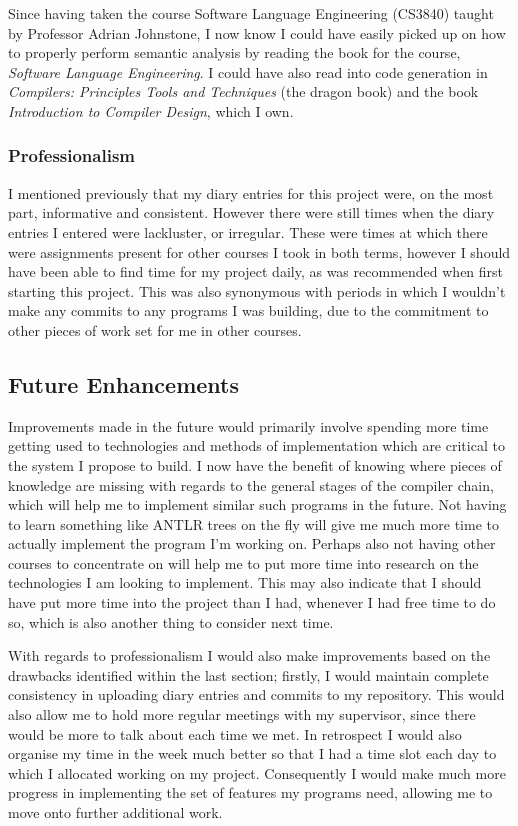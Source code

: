 \documentclass[a4paper, 11pt]{article}
\begin{document}
Since having taken the course Software Language Engineering (CS3840) taught by Professor Adrian Johnstone, I now know I could have easily picked up on how to properly perform semantic analysis by reading the book for the course, \textit{Software Language Engineering}\cite{SLEBook}. I could have also read into code generation in \textit{Compilers: Principles Tools and Techniques}\cite{Dragon} (the dragon book) and the book \textit{Introduction to Compiler Design}\cite{ItCD}, which I own.

\subsubsection{Professionalism}
I mentioned previously that my diary entries for this project were, on the most part, informative and consistent. However there were still times when the diary entries I entered were lackluster, or irregular. These were times at which there were assignments present for other courses I took in both terms, however I should have been able to find time for my project daily, as was recommended when first starting this project. This was also synonymous with periods in which I wouldn't make any commits to any programs I was building, due to the commitment to other pieces of work set for me in other courses.

\subsection{Future Enhancements}
Improvements made in the future would primarily involve spending more time getting used to technologies and methods of implementation which are critical to the system I propose to build. I now have the benefit of knowing where pieces of knowledge are missing with regards to the general stages of the compiler chain, which will help me to implement similar such programs in the future. Not having to learn something like ANTLR trees on the fly will give me much more time to actually implement the program I'm working on. Perhaps also not having other courses to concentrate on will help me to put more time into research on the technologies I am looking to implement. This may also indicate that I should have put more time into the project than I had, whenever I had free time to do so, which is also another thing to consider next time.

With regards to professionalism I would also make improvements based on the drawbacks identified within the last section; firstly, I would maintain complete consistency in uploading diary entries and commits to my repository. This would also allow me to hold more regular meetings with my supervisor, since there would be more to talk about each time we met. In retrospect I would also organise my time in the week much better so that I had a time slot each day to which I allocated working on my project. Consequently I would make much more progress in implementing the set of features my programs need, allowing me to move onto further additional work.
\end{document}
